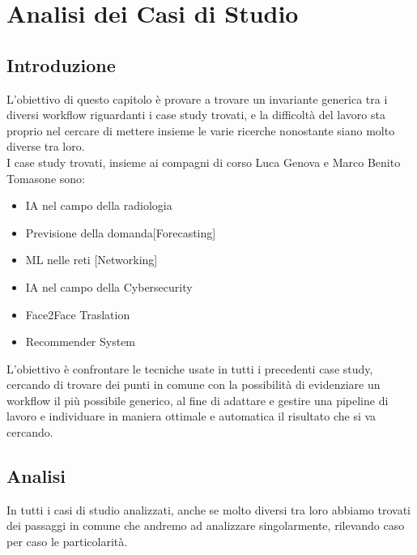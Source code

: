 \documentclass[../tesi.tex]{subfiles}
\begin{document}
\chapter{Analisi dei Casi di Studio}
\section{Introduzione}
L’obiettivo di questo capitolo è provare a trovare un invariante generica tra i diversi workflow riguardanti i case study trovati, e la difficoltà del lavoro sta proprio nel cercare di mettere insieme le varie ricerche nonostante siano molto diverse tra loro.\\
I case study trovati, insieme ai compagni di corso Luca Genova e Marco Benito Tomasone sono:
\begin{itemize}
  \item IA nel campo della radiologia
  \item	Previsione della domanda[Forecasting]
  \item ML nelle reti [Networking]
  \item	IA nel campo della Cybersecurity
  \item Face2Face Traslation
  \item	Recommender System 
\end{itemize}
L’obiettivo è confrontare le tecniche usate in tutti i precedenti case study, cercando di trovare dei punti in comune con la possibilità di evidenziare un workflow il più possibile generico, al fine di adattare e gestire una pipeline di lavoro e individuare in maniera ottimale e automatica il risultato che si va cercando.

\section{Analisi}
In tutti i casi di studio analizzati, anche se molto diversi tra loro abbiamo trovati dei passaggi in comune che andremo ad analizzare singolarmente, rilevando caso per caso le particolarità.
\end{document}
